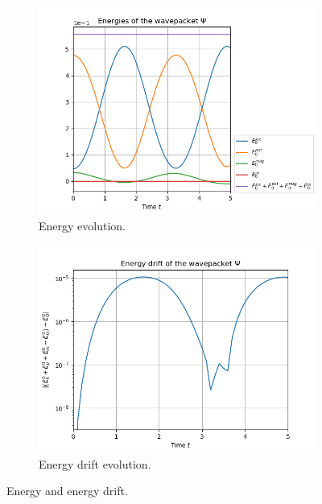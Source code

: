 \documentclass{article}
\begin{document}
\begin{figure}[H]
  \begin{subfigure}[b]{0.45 \textwidth}
    \includegraphics[width = \textwidth]{graphics/torsional/energies_block0.PNG}
    \caption{Energy evolution.}
  \end{subfigure}
  \hfill
  \begin{subfigure}[b]{0.45 \textwidth}
    \includegraphics[width = \textwidth]{graphics/torsional/energy_drift_block0_log.PNG}
    \caption{Energy drift evolution.}
  \end{subfigure}
  \caption{Energy and energy drift.}
  \label{fig:cos_energy}
\end{figure}
\end{document}
